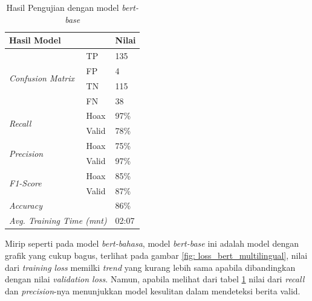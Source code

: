 \begin{table}[h]
    \caption{Hasil Pengujian dengan model \textit{bert-base}}
    \label{tab: loss_multilingual}
    \centering
    \begin{tabular}{|l|l|l|}
        \hline
        \multicolumn{2}{|l|}{\textbf{Hasil Model}}              & \textbf{Nilai}        \\ \hline
        \multirow{4}{*}{\textit{Confusion Matrix}}              & TP             & 135  \\ \cline{2-3}
                                                                & FP             & 4    \\ \cline{2-3}
                                                                & TN             & 115  \\ \cline{2-3}
                                                                & FN             & 38   \\ \hline
        \multirow{2}{*}{\textit{Recall}}                        & Hoax           & 97\% \\ \cline{2-3}
                                                                & Valid          & 78\% \\ \hline
        \multirow{2}{*}{\textit{Precision}}                     & Hoax           & 75\% \\ \cline{2-3}
                                                                & Valid          & 97\% \\ \hline
        \multirow{2}{*}{\textit{F1-Score}}                      & Hoax           & 85\% \\ \cline{2-3}
                                                                & Valid          & 87\% \\ \hline
        \multicolumn{2}{|l|}{\textit{Accuracy}}                 & 86\%                  \\ \hline
        \multicolumn{2}{|l|}{\textit{Avg. Training Time (mnt)}} & 02:07                 \\ \hline
    \end{tabular}
\end{table}

Mirip seperti pada model \textit{bert-bahasa}, model \textit{bert-base} ini adalah model dengan grafik yang cukup bagus, terlihat pada gambar \ref{fig: loss_bert_multilingual}, nilai dari \textit{training loss} memilki \textit{trend} yang kurang lebih sama apabila dibandingkan dengan nilai \textit{validation loss}. Namun, apabila melihat dari tabel \ref{tab: loss_multilingual} nilai dari \textit{recall} dan \textit{precision}-nya menunjukkan model kesulitan dalam mendeteksi berita valid.

